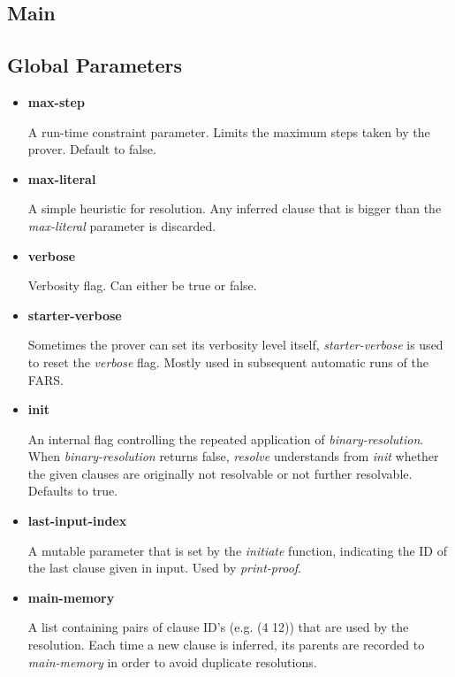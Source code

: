 \documentclass[11pt]{report}
\begin{document}
\begin{appendices}
\newpage

\section{Main}

\subsection{Global Parameters}

\begin{itemize}
 \item \textbf{max-step}
 
A run-time constraint parameter. Limits the maximum steps taken by the prover. Default to false.

 \item \textbf{max-literal}

A simple heuristic for resolution. Any inferred clause that is bigger than the \textit{max-literal} parameter is discarded.

 \item \textbf{verbose}

 Verbosity flag. Can either be true or false.

 \item \textbf{starter-verbose}

 Sometimes the prover can set its verbosity level itself, \textit{starter-verbose} is used to reset the \textit{verbose} flag. Mostly used in subsequent automatic runs of the FARS.

 \item \textbf{init}

 An internal flag controlling the repeated application of \textit{binary-resolution}. When \textit{binary-resolution} returns false, \textit{resolve} understands from \textit{init} whether the given clauses are originally not resolvable or not further resolvable. Defaults to true.

 \item \textbf{last-input-index}

 A mutable parameter that is set by the \textit{initiate} function, indicating the ID of the last clause given in input. Used by \textit{print-proof}.

 \item \textbf{main-memory}

A list containing pairs of clause ID's (e.g. (4 12)) that are used by the resolution. Each time a new clause is inferred, its parents are recorded to \textit{main-memory} in order to avoid duplicate resolutions.


\end{itemize}
\end{appendices}
\end{document}
